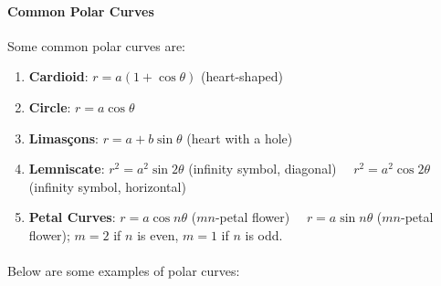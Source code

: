 \documentclass[11pt]{report}
\begin{document}
\paragraph{Common Polar Curves} Some common polar curves are:
\begin{enumerate}
    \item \textbf{Cardioid}: $r = a(1 + \cos \theta)$ (heart-shaped)
    \item \textbf{Circle}: $r = a\cos \theta$ 
    \item \textbf{Limasçons}: $r = a + b\sin \theta$ (heart with a hole)
    \item \textbf{Lemniscate}: $r^2 = a^2\sin 2\theta$ (infinity symbol, diagonal) \vspace{1em} $\quad r^2 = a^2\cos 2\theta$ (infinity symbol, horizontal)
    \item \textbf{Petal Curves}: $r = a\cos n\theta$ ($mn$-petal flower) \vspace{1em} $\quad r = a\sin n\theta$ ($mn$-petal flower); $m=2$ if $n$ is even, $m=1$ if $n$ is odd.
\end{enumerate}
\paragraph{} Below are some examples of polar curves:
\begin{figure}[h!]
    \centering
    \begin{minipage}{0.48\textwidth}
        \centering
    \end{minipage}
    \hfill
    \begin{minipage}{0.48\textwidth}
        \centering
    \end{minipage}
\end{figure}
\end{document}
